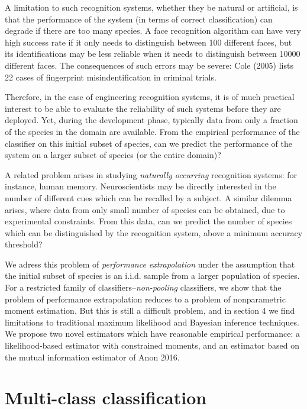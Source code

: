 \documentclass{article}
\begin{document}
A limitation to such recognition systems, whether they be natural or
artificial, is that the performance of the system (in terms of correct
classification) can degrade if there are too many species.  A face
recognition algorithm can have very high success rate if it only needs
to distinguish between 100 different faces, but its identifications
may be less reliable when it needs to distinguish between 10000
different faces.  The consequences of such errors may be severe: Cole
(2005) lists 22 cases of fingerprint misindentification in criminal
trials.

Therefore, in the case of engineering recognition systems, it is of
much practical interest to be able to evaluate the reliability of such
systems before they are deployed.  Yet, during the development phase,
typically data from only a fraction of the species in the domain are
available.  From the empirical performance of the classifier on this
initial subset of species, can we predict the performance of the
system on a larger subset of species (or the entire domain)?

A related problem arises in studying \emph{naturally occurring}
recognition systems: for instance, human memory.  Neuroscientists may
be directly interested in the number of different cues which can be
recalled by a subject.  A similar dilemma arises, where data from only
small number of species can be obtained, due to experimental
constraints.  From this data, can we predict the number of species
which can be distinguished by the recognition system, above a minimum
accuracy threshold?

We adress this problem of \emph{performance extrapolation} under the
assumption that the initial subset of species is an i.i.d. sample from
a larger population of species.  For a restricted family of
classifiers--\emph{non-pooling} classifiers, we show that the problem
of performance extrapolation reduces to a problem of nonparametric
moment estimation.  But this is still a difficult problem, and in
section 4 we find limitations to traditional maximum likelihood and
Bayesian inference techniques.  We propose two novel estimators which have reasonable empirical performance:
a likelihood-based estimator with constrained moments,
and an estimator based on the mutual information estimator of Anon 2016.

\section{Multi-class classification}
\end{document}
